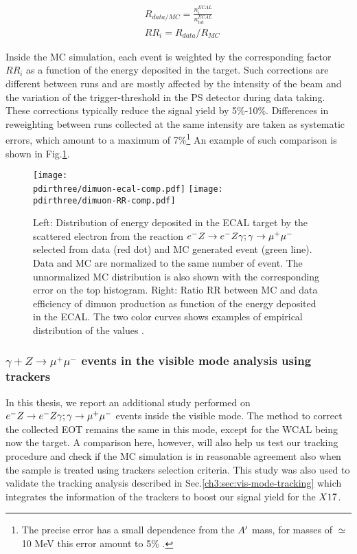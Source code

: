 \begin{equation}  
  \label{eq:RR-factor}
  \begin{aligned}
  &R_{data/MC} = \frac{n_i^{ECAL}}{n_{tot}^{ECAL}} \\
  &RR_i = R_{data}/R_{MC}
  \end{aligned}
\end{equation}

Inside the MC simulation, each event is weighted by the corresponding factor $RR_i$ as a function of the energy deposited in the target. Such corrections are different between runs and are mostly affected by the intensity of the beam and the variation of the trigger-threshold in the PS detector during data taking. These corrections typically reduce the signal yield by 5\%-10\%. Differences in reweighting between runs collected at the same intensity are taken as systematic errors, which amount to a maximum of 7\%\footnote{The precise error has a small dependence from the $A'$ mass, for masses of $\simeq$10 MeV this error amount to 5\% \cite{na64-prd}.} An example of such comparison is shown in Fig.\ref{fig:dimuon-comp-invis}.

\begin{figure}[tbh!]
  \centering
  \texttt{[image: \\pdirthree/dimuon-ecal-comp.pdf]}
  \texttt{[image: \\pdirthree/dimuon-RR-comp.pdf]}
  \caption[Dimuon spectra in ECAL for data and MC.]{Left: Distribution of energy deposited in the ECAL target by the scattered electron from the reaction $e^- Z \to e^- Z \gamma; \gamma \to \mu^+ \mu^-$ selected from data (red dot) and MC generated event (green line). Data and MC are normalized to the same number of event. The unnormalized MC distribution is also shown with the corresponding error on the top histogram. Right: Ratio RR between MC and data efficiency of dimuon production as function of the energy deposited in the ECAL. The two color curves shows examples of empirical distribution of the values \cite{na64-prd}.}
  \label{fig:dimuon-comp-invis}
\end{figure}

\subsubsection{$\gamma + Z \rightarrow \mu^+ \mu^-$ events in the visible mode analysis using trackers}

In this thesis, we report an additional study performed on $e^- Z \to e^- Z \gamma; \gamma \to \mu^+ \mu^-$ events inside the visible mode. The method to correct the collected EOT remains the same in this mode, except for the WCAL being now the target. A comparison here, however, will also help us test our tracking procedure and check if the MC simulation is in reasonable agreement also when the sample is treated using trackers selection criteria. This study was also used to validate the tracking analysis described in Sec.\ref{ch3:sec:vis-mode-tracking} which integrates the information of the trackers to boost our signal yield for the $X17$.

